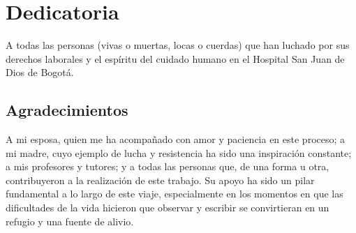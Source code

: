 \section*{Dedicatoria}

\vspace{2cm}

A todas las personas (vivas o muertas, locas o cuerdas) que han luchado por sus derechos laborales y el espíritu del cuidado humano en el Hospital San Juan de Dios de Bogotá.

\vspace{4cm}

\subsection*{Agradecimientos}
A mi esposa, quien me ha acompañado con amor y paciencia en este proceso; a mi madre, cuyo ejemplo de lucha y resistencia ha sido una inspiración constante; a mis profesores y tutores; y a todas las personas que, de una forma u otra, contribuyeron a la realización de este trabajo. Su apoyo ha sido un pilar fundamental a lo largo de este viaje, especialmente en los momentos en que las dificultades de la vida hicieron que observar y escribir se convirtieran en un refugio y una fuente de alivio.
\pagebreak